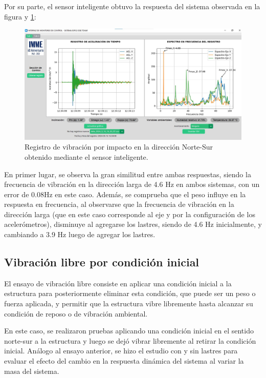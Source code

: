 Por su parte, el sensor inteligente obtuvo la respuesta del sistema observada en la figura y \ref{fig:impactoGUI_NS}:

\begin{figure}[H]
    \centering
    \includegraphics[width = \textwidth]{imagenes/cap3_resultados/Ensayos/VibHammer1NorteSurSMARTSENSOR.jpg}
    \caption{Registro de vibración por impacto en la dirección Norte-Sur obtenido mediante el sensor inteligente.}
    \label{fig:impactoGUI_NS}
\end{figure}

En primer lugar, se observa la gran similitud entre ambas respuestas, siendo la frecuencia de vibración en la dirección larga de 4.6 Hz en ambos sistemas, con un error de 0.08Hz en este caso. Además, se comprueba que el peso influye en la respuesta en frecuencia, al observarse que la frecuencia de vibración en la dirección larga (que en este caso corresponde al eje y por la configuración de los acelerómetros), disminuye al agregarse los lastres, siendo de 4.6 Hz inicialmente, y cambiando a 3.9 Hz luego de agregar los lastres.

\subsection{Vibración libre por condición inicial}

El ensayo de vibración libre consiste en aplicar una condición inicial a la estructura para posteriormente eliminar esta condición, que puede ser un peso o fuerza aplicada, y permitir que la estructura vibre libremente hasta alcanzar su condición de reposo o de vibración ambiental.

En este caso, se realizaron pruebas aplicando una condición inicial en el sentido norte-sur a la estructura y luego se dejó vibrar libremente al retirar la condición inicial. Análogo al ensayo anterior, se hizo el estudio con y sin lastres para evaluar el efecto del cambio en la respuesta dinámica del sistema al variar la masa del sistema.

